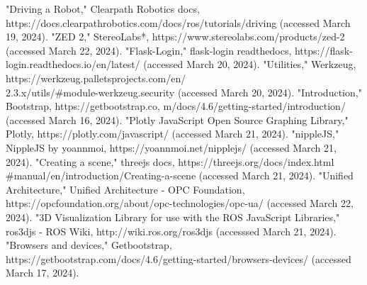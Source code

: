 \documentclass[conference]{IEEEtran}
\begin{document}
\begin{thebibliography}{00}
"Driving a Robot," Clearpath Robotics docs, https://docs.clearpathrobotics.com/docs/ros/tutorials/driving (accessed March 19, 2024).
"ZED 2," StereoLabs*, https://www.stereolabs.com/products/zed-2 (accessed March 22, 2024).
"Flask-Login," flask-login readthedocs, https://flask-login.readthedocs.io/en/latest/ (accessed March 20, 2024).
"Utilities," Werkzeug, https://werkzeug.palletsprojects.com/en/\\2.3.x/utils/\#module-werkzeug.security (accessed March 20, 2024).
"Introduction," Bootstrap, https://getbootstrap.co, m/docs/4.6/getting-started/introduction/ (accessed March 16, 2024).
"Plotly JavaScript Open Source Graphing Library," Plotly, https://plotly.com/javascript/ (accessed March 21, 2024).
"nippleJS," NippleJS by yoannmoi, https://yoannmoi.net/nipplejs/ (accessed March 21, 2024).
"Creating a scene," threejs docs, https://threejs.org/docs/index.html\\\#manual/en/introduction/Creating-a-scene (accessed March 21, 2024).
"Unified Architecture," Unified Architecture - OPC Foundation, https://opcfoundation.org/about/opc-technologies/opc-ua/ (accessed March 22, 2024).
"3D Visualization Library for use with the ROS JavaScript Libraries," ros3djs - ROS Wiki, http://wiki.ros.org/ros3djs (accesssed March 21, 2024).
"Browsers and devices," Getbootstrap, https://getbootstrap.com/docs/4.6/getting-started/browsers-devices/ (accessed March 17, 2024).
\end{thebibliography}
\vspace{12pt}
\end{document}
